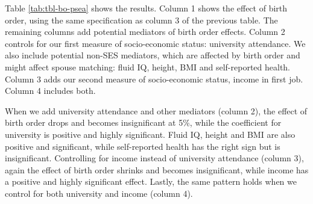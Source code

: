 \documentclass[
  12pt,
]{article}
\theoremstyle{definition}
\theoremstyle{definition}
\theoremstyle{definition}
\theoremstyle{definition}
\theoremstyle{remark}
\begin{document}
Table \ref{tab:tbl-bo-psea} shows the results. Column 1 shows the
effect of birth order, using the same specification as column 3 of the
previous table. The remaining columns add potential mediators of
birth order effects. Column 2 controls for our first measure of
socio-economic status: university attendance. We also include potential
non-SES mediators, which are affected by birth order and might affect spouse
matching: fluid IQ, height, BMI and self-reported health. Column 3 adds our
second measure of socio-economic status, income in first job. Column 4 includes
both.

When we add university attendance and other mediators (column 2), the effect of
birth order drops and becomes insignificant at 5\%, while the coefficient for
university is positive and highly significant. Fluid IQ, height and BMI are also
positive and significant, while self-reported health has the right sign but is
insignificant. Controlling for income instead of university attendance (column
3), again the effect of birth order shrinks and becomes insignificant, while
income has a positive and highly significant effect. Lastly, the same pattern
holds when we control for both university and income (column 4).

 
  \providecommand{\huxb}[2]{\arrayrulecolor[RGB]{#1}\global\arrayrulewidth=#2pt}
  \providecommand{\huxvb}[2]{\color[RGB]{#1}\vrule width #2pt}
  \providecommand{\huxtpad}[1]{\rule{0pt}{#1}}
  \providecommand{\huxbpad}[1]{\rule[-#1]{0pt}{#1}}
\end{document}
